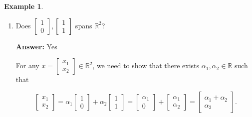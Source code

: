 \documentclass[12pt]{article}
\theoremstyle{definition}
\newtheorem*{example}{Example}
\begin{document}
\begin{example}
\begin{enumerate}[label = (\arabic*)]
\begin{proof}
\[
x =
\begin{bmatrix}
x_1 \\
x_2
\end{bmatrix}
=
x_1
\begin{bmatrix}
1 \\
0
\end{bmatrix}
+
x_2
\begin{bmatrix}
0 \\
1
\end{bmatrix}
+
0
\cdot
\begin{bmatrix}
1 \\
1
\end{bmatrix}.
\]
\end{proof}

Therefore, $\{e_1, e_2\}$ spans $\mathbb{R}^2$.

\item Does $\begin{bmatrix} 1 \\ 0 \end{bmatrix}, \begin{bmatrix} 1 \\ 1 \end{bmatrix}$
spans $\mathbb{R}^2$?

\vspace{0.2cm}

\textbf{Answer:} Yes

\vspace{0.2cm}

For any $x = \begin{bmatrix} x_1 \\ x_2 \end{bmatrix} \in \mathbb{R}^2$, we need to
show that there exists $\alpha_1, \alpha_2 \in \mathbb{R}$ such that

\[
\begin{bmatrix}
x_1 \\
x_2
\end{bmatrix}
=
\alpha_1
\begin{bmatrix}
1 \\
0
\end{bmatrix}
+
\alpha_2
\begin{bmatrix}
1 \\
1
\end{bmatrix}
= 
\begin{bmatrix}
\alpha_1 \\
0
\end{bmatrix}
+
\begin{bmatrix}
\alpha_1 \\
\alpha_2
\end{bmatrix}
=
\begin{bmatrix}
\alpha_1 + \alpha_2 \\
\alpha_2
\end{bmatrix}.
\]


\end{enumerate}
\end{example}
\end{document}
